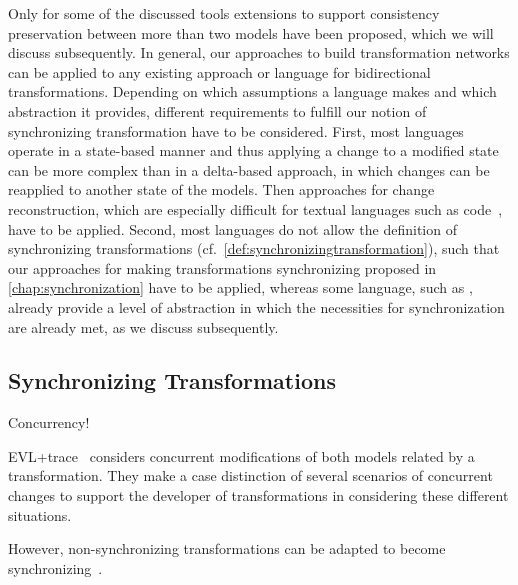 Only for some of the discussed tools extensions to support consistency preservation between more than two models have been proposed, which we will discuss subsequently.
In general, our approaches to build transformation networks can be applied to any existing approach or language for bidirectional transformations.
Depending on which assumptions a language makes and which abstraction it provides, different requirements to fulfill our notion of synchronizing transformation have to be considered.
First, most languages operate in a state-based manner and thus applying a change to a modified state can be more complex than in a delta-based approach, in which changes can be reapplied to another state of the models. Then approaches for change reconstruction, which are especially difficult for textual languages such as code~\cite{falleri2014codeDifferencing-ASE}, have to be applied.
Second, most languages do not allow the definition of synchronizing transformations (cf.\ \autoref{def:synchronizingtransformation}), such that our approaches for making transformations synchronizing proposed in \autoref{chap:synchronization} have to be applied, whereas some language, such as \qvtr, already provide a level of abstraction in which the necessities for synchronization are already met, as we discuss subsequently.


\subsection{Synchronizing Transformations}
Concurrency!

EVL+trace~\cite{samimi-dehkordi2015bidirectionalSynchronization-ICCKE} considers concurrent modifications of both models related by a transformation.
They make a case distinction of several scenarios of concurrent changes to support the developer of transformations in considering these different situations.

However, non-synchronizing transformations can be adapted to become synchronizing~\cite{xiong2013SynchronizingConcurrentUpdates-SoSym}.

